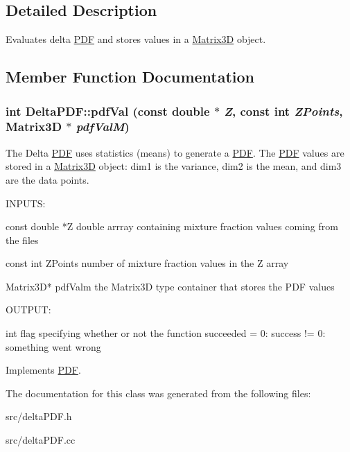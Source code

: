 \subsection{Detailed Description}
Evaluates delta \hyperlink{classPDF}{PDF} and stores values in a \hyperlink{classMatrix3D}{Matrix3D} object. 

\subsection{Member Function Documentation}
\hypertarget{classDeltaPDF_a787e205c3bd8d4f95f7c528497e3a617}{
\subsubsection[{pdfVal}]{\setlength{\rightskip}{0pt plus 5cm}int DeltaPDF::pdfVal (const double $\ast$ {\em Z}, \/  const int {\em ZPoints}, \/  {\bf Matrix3D} $\ast$ {\em pdfValM})}}
\label{dd/d98/classDeltaPDF_a787e205c3bd8d4f95f7c528497e3a617}
The Delta \hyperlink{classPDF}{PDF} uses statistics (means) to generate a \hyperlink{classPDF}{PDF}. The \hyperlink{classPDF}{PDF} values are stored in a \hyperlink{classMatrix3D}{Matrix3D} object: dim1 is the variance, dim2 is the mean, and dim3 are the data points.

\begin{DoxyVerb}
  
  INPUTS: 
  
  const double *Z           double arrray containing mixture fraction values coming from the files

  const int ZPoints         number of mixture fraction values in the Z array

  Matrix3D* pdfValm         the Matrix3D type container that stores the PDF values


  OUTPUT:

  int                       flag specifying whether or not the function succeeded
                             = 0: success
			    != 0: something went wrong

  \end{DoxyVerb}
 

Implements \hyperlink{classPDF}{PDF}.

The documentation for this class was generated from the following files:\begin{DoxyCompactItemize}
\item 
src/deltaPDF.h\item 
src/deltaPDF.cc\end{DoxyCompactItemize}
